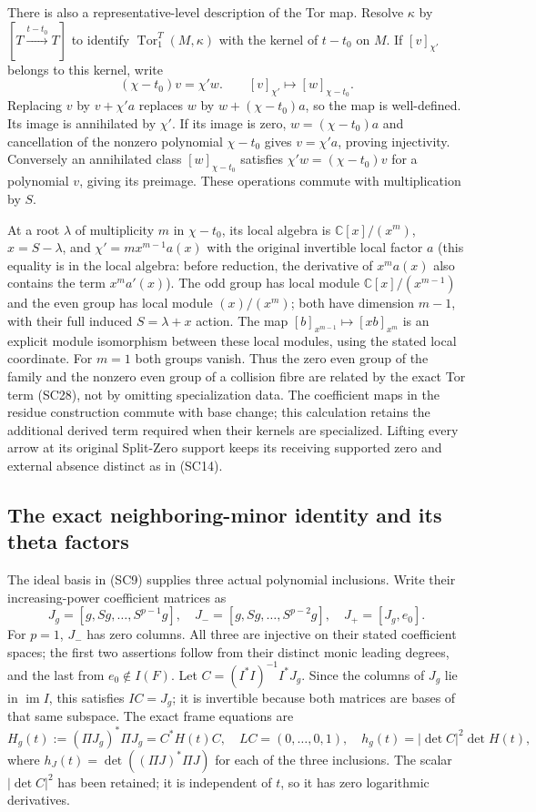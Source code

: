 There is also a representative-level description of the Tor map.
Resolve $\kappa$ by $[T\xrightarrow{t-t_0}T]$ to identify
$\operatorname{Tor}_1^T(M,\kappa)$ with the kernel of $t-t_0$ on
$M$.  If $[v]_{\chi'}$ belongs to this kernel, write
\[
  (\chi-t_0)v=\chi'w.
  \qquad [v]_{\chi'}\longmapsto[w]_{\chi-t_0}.
 \tag{SC30}
\]
Replacing $v$ by $v+\chi'a$ replaces $w$ by $w+(\chi-t_0)a$,
so the map is well-defined.  Its image is annihilated by $\chi'$.
If its image is zero, $w=(\chi-t_0)a$ and cancellation of the
nonzero polynomial $\chi-t_0$ gives $v=\chi'a$, proving
injectivity.  Conversely an annihilated class $[w]_{\chi-t_0}$
satisfies $\chi'w=(\chi-t_0)v$ for a polynomial $v$, giving its
preimage.  These operations commute with multiplication by $S$.

At a root $\lambda$ of multiplicity $m$ in $\chi-t_0$, its local
algebra is $\mathbb C[x]/(x^m)$, $x=S-\lambda$, and
$\chi'=m x^{m-1}a(x)$ with the original invertible local factor
$a$ (this equality is in the local algebra: before reduction,
the derivative of $x^ma(x)$ also contains the term $x^ma'(x)$).
The odd group has local module
$\mathbb C[x]/(x^{m-1})$ and the even group has local module
$(x)/(x^m)$; both have dimension $m-1$, with their full induced
$S=\lambda+x$ action.  The map
$[b]_{x^{m-1}}\mapsto[xb]_{x^m}$ is an explicit module isomorphism
between these local modules, using the stated local coordinate.
For $m=1$ both groups vanish.
Thus the zero even group of the family and the nonzero even group
of a collision fibre are related by the exact Tor term (SC28),
not by omitting specialization data.  The coefficient maps in
the residue construction commute with base change; this calculation
retains the additional derived term required when their kernels
are specialized.  Lifting every arrow at its original Split-Zero
support keeps its receiving supported zero and external absence
distinct as in (SC14).

\subsection{The exact neighboring-minor identity and its theta factors}

The ideal basis in (SC9) supplies three actual polynomial inclusions.
Write their increasing-power coefficient matrices as
\[
 J_g=[g,Sg,\ldots,S^{p-1}g],\quad
 J_-=[g,Sg,\ldots,S^{p-2}g],\quad
 J_+=[J_g,e_0].
 \tag{SC31}
\]
For $p=1$, $J_-$ has zero columns.  All three are injective on their
stated coefficient spaces; the first two assertions follow from
their distinct monic leading degrees, and the last from
$e_0\notin I(F)$.  Let
$C=(I^*I)^{-1}I^*J_g$.  Since the columns of $J_g$ lie in
$\operatorname{im}I$, this satisfies $IC=J_g$; it is invertible
because both matrices are bases of that same subspace.  The exact
frame equations are
\[
 H_g(t):=(\Pi J_g)^*\Pi J_g=C^*H(t)C,
 \quad LC=(0,\ldots,0,1),\quad
 h_g(t)=|\det C|^2\det H(t),
 \tag{SC32}
\]
where $h_J(t)=\det((\Pi J)^*\Pi J)$ for each of the three
inclusions.  The scalar $|\det C|^2$ has been retained; it is
independent of $t$, so it has zero logarithmic derivatives.

